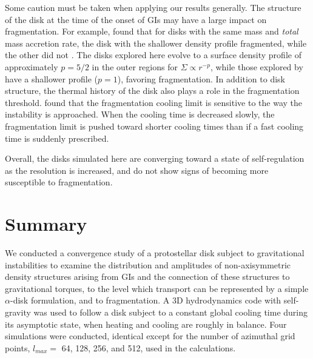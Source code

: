 \documentclass[manuscript]{aastex}
\begin{document}
Some caution must be taken when applying our results generally.  The structure of the disk at the time of the onset of GIs may have a large impact on fragmentation.  For example, \cite{boley2009} found that for disks with the same mass and {\it total} mass accretion rate, the disk with the shallower density profile fragmented, while the other did not \citep[see also ][]{meru2011b}.  The disks explored here evolve to a surface density profile of approximately $p=5/2$ in the outer regions for $\Sigma\propto r^{-p}$, while those explored by \citet{meru2011a} have a shallower profile ($p=1$), favoring fragmentation.  In addition to disk structure, the thermal history of the disk also plays a role in the fragmentation threshold.  \cite{clarke2007}  found that the fragmentation cooling limit is sensitive to the way the instability is approached.  When the cooling time is decreased slowly, the fragmentation limit is pushed toward shorter cooling times than if a fast cooling time is suddenly prescribed.  

Overall, the disks simulated here are converging toward a state of self-regulation as the resolution is
increased, and do not show signs of becoming more susceptible to fragmentation.


\section{Summary}

We conducted a convergence study of a protostellar disk subject to gravitational instabilities to examine the
distribution and amplitudes of non-axisymmetric density structures arising from GIs and the connection of
these structures to gravitational torques, to the level which transport can be represented by a simple
$\alpha$-disk formulation, and to fragmentation.  A 3D hydrodynamics code with self-gravity was used to follow
a disk subject to a constant global cooling time during its asymptotic state, when heating and cooling are
roughly in balance.  Four simulations were conducted, identical except for the number of azimuthal grid
points, $l_{max} = $ 64, 128, 256, and 512, used in the calculations.
\end{document}
